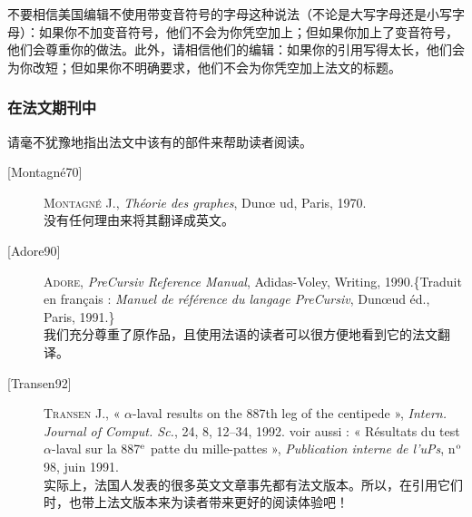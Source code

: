 不要相信美国编辑不使用带变音符号的字母这种说法（不论是大写字母还是小写字母）：如果你不加变音符号，他们不会为你凭空加上；但如果你加上了变音符号，他们会尊重你的做法。此外，请相信他们的编辑：如果你的引用写得太长，他们会为你改短；但如果你不明确要求，他们不会为你凭空加上法文的标题。

\subsubsection*{在法文期刊中}

请毫不犹豫地指出法文中该有的部件来帮助读者阅读。

\begin{description}
    \item[{[Montagné70]}] \textsc{Montagné} J., \emph{Théorie des graphes}, Dunœ ud, Paris, 1970.\\
    没有任何理由来将其翻译成英文。
    \item[{[Adore90]}] \textsc{Adore}, \emph{PreCursiv Reference Manual}, Adidas-Voley, Writing, 1990.\linebreak \{Traduit en français : \emph{Manuel de référence du langage PreCursiv}, Dunœud éd., Paris, 1991.\}\\
    我们充分尊重了原作品，且使用法语的读者可以很方便地看到它的法文翻译。
    \item[{[Transen92]}] \textsc{Transen} J., « $\alpha$-laval results on the 887th leg of the centipede », \emph{Intern. Journal of Comput. Sc.}, 24, 8, 12–34, 1992. {voir aussi : « Résultats du test $\alpha$-laval sur la 887$^{\rm e}$ patte du mille-pattes », \emph{Publication interne de l'uPs}, n$^{\rm o}$ 98, juin 1991.}\\
    实际上，法国人发表的很多英文文章事先都有法文版本。所以，在引用它们时，也带上法文版本来为读者带来更好的阅读体验吧！
\end{description}